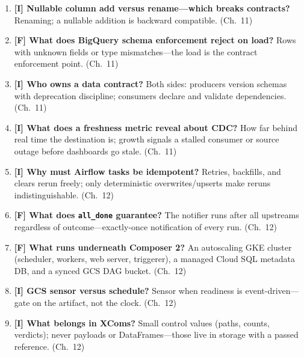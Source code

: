 \begin{enumerate}
    \item \textbf{[I] Nullable column add versus rename---which breaks contracts?} Renaming; a
    nullable addition is backward compatible. (Ch.~11)
    \item \textbf{[F] What does BigQuery schema enforcement reject on load?} Rows with unknown
    fields or type mismatches---the load is the contract enforcement point. (Ch.~11)
    \item \textbf{[I] Who owns a data contract?} Both sides: producers version schemas with
    deprecation discipline; consumers declare and validate dependencies. (Ch.~11)
    \item \textbf{[I] What does a freshness metric reveal about CDC?} How far behind real time the
    destination is; growth signals a stalled consumer or source outage before dashboards go stale.
    (Ch.~11)
    \item \textbf{[I] Why must Airflow tasks be idempotent?} Retries, backfills, and clears rerun
    freely; only deterministic overwrites/upserts make reruns indistinguishable. (Ch.~12)
    \item \textbf{[F] What does \texttt{all\_done} guarantee?} The notifier runs after all
    upstreams regardless of outcome---exactly-once notification of every run. (Ch.~12)
    \item \textbf{[F] What runs underneath Composer 2?} An autoscaling GKE cluster (scheduler,
    workers, web server, triggerer), a managed Cloud SQL metadata DB, and a synced GCS DAG bucket.
    (Ch.~12)
    \item \textbf{[I] GCS sensor versus schedule?} Sensor when readiness is event-driven---gate on
    the artifact, not the clock. (Ch.~12)
    \item \textbf{[I] What belongs in XComs?} Small control values (paths, counts, verdicts);
    never payloads or DataFrames---those live in storage with a passed reference. (Ch.~12)
\end{enumerate}

